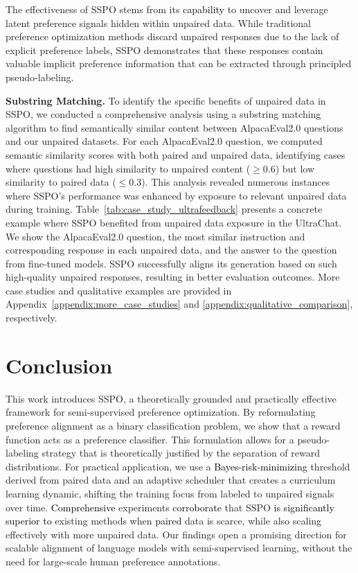 \documentclass{article} %
\newcommand\fix[1]{\textcolor{black}{#1}}
\newcommand\turnitin[1]{\textcolor{black}{#1}}
\begin{document}
\begin{table}[t]
\begin{tabular}{p{1.5cm} p{11.5cm}}
        \bottomrule
    \end{tabular}
\end{table}

The effectiveness of SSPO stems from its \turnitin{capability} to uncover and leverage latent preference signals hidden within unpaired data. While traditional preference optimization methods discard unpaired responses due to the lack of explicit preference labels, SSPO demonstrates that these responses contain valuable implicit preference information that can be extracted through principled pseudo-labeling.

\noindent\textbf{Substring Matching.} To identify the specific benefits of unpaired data in SSPO, we conducted a comprehensive analysis using a substring matching algorithm to find semantically similar content between AlpacaEval2.0 questions and our unpaired datasets. For each AlpacaEval2.0 question, we computed semantic similarity scores with both paired and unpaired data, identifying cases where questions had high similarity to unpaired content ($\ge 0.6$) but low similarity to paired data ($\le 0.3$). This analysis revealed numerous instances where SSPO's performance was enhanced by exposure to relevant unpaired data during training.
Table~\ref{tab:case_study_ultrafeedback} presents a concrete example where SSPO benefited from unpaired data exposure in the UltraChat. We show the AlpacaEval2.0 question, the most similar instruction and corresponding response in each unpaired data, and the answer to the question from fine-tuned models. SSPO successfully aligns its generation based on such high-quality unpaired responses, resulting in better evaluation outcomes. More case studies and qualitative examples are provided in Appendix~\ref{appendix:more_case_studies} and \ref{appendix:qualitative_comparison}, respectively.

\section{Conclusion}
This work introduces SSPO, a theoretically grounded and practically effective framework for semi-supervised preference optimization. By reformulating preference alignment as a binary classification problem, we show that a reward function acts as a preference classifier. This formulation allows for a pseudo-labeling strategy that is theoretically justified by the separation of reward distributions. For practical application, we use a \fix{Bayes-risk-minimizing} threshold derived from paired data and an adaptive scheduler that creates a curriculum learning dynamic, shifting the training focus from labeled to unpaired signals over time. \turnitin{Comprehensive} experiments \turnitin{corroborate} that SSPO \turnitin{is significantly superior to} existing methods when \fix{paired} data is scarce, while also scaling effectively with more unpaired data. Our findings open a promising direction for scalable alignment of language models with semi-supervised learning, without the need for large-scale human preference annotations.
\end{document}

